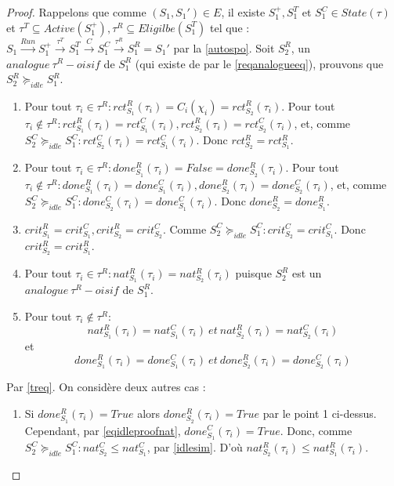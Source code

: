 \documentclass[a4paper]{report}
\theoremstyle{break}
\theoremstyle{breakplain}
\begin{document}
\begin{proof}
Rappelons que comme $(S_1, S_1') \in E$, il existe $S^{+}_1, S^{T}_1$ et $S^{C}_1 \in State(\tau)$ et $\tau^T \subseteq Active(S^{+}_1),\tau^R \subseteq Eligilbe(S^{T}_1) $ tel que : $S_1\xrightarrow{Run}S^{+}_1\xrightarrow{\tau^T}S^{T}_1\xrightarrow{C}S^{C}_1\xrightarrow{\tau^R}S_1^R=S_1'$ par la \autoref{autospo}. Soit $S_2^R$, un $analogue\ \tau^R-oisif$ de $S_1^R$ (qui existe de par le \autoref{reqanalogueeq}), prouvons que $S_2^R \succeq_{idle} S_1^R$.
\begin{enumerate}
\item Pour tout $\tau_i \in \tau^R : rct_{S_1}^R(\tau_i) = C_i(\chi_i) = rct_{S_2}^R(\tau_i)$. Pour tout $\tau_i \notin \tau^R : rct_{S_1}^R(\tau_i) = rct_{S_1}^C(\tau_i), rct_{S_2}^R(\tau_i) = rct_{S_2}^C(\tau_i)$, et, comme $S^C_2 \succeq_{idle} S^C_1 : rct_{S_2}^C(\tau_i) = rct_{S_1}^C(\tau_i)$. Donc $rct_{S_2}^R = rct_{S_1}^R$.
\item Pour tout $\tau_i \in \tau^R : done_{S_1}^R(\tau_i) = False = done_{S_2}^R(\tau_i)$. Pour tout $\tau_i \notin \tau^R : done_{S_1}^R(\tau_i) = done_{S_1}^C(\tau_i), done_{S_2}^R(\tau_i) = done_{S_2}^C(\tau_i)$, et, comme $S^C_2 \succeq_{idle} S^C_1 : done_{S_2}^C(\tau_i) = done_{S_1}^C(\tau_i)$. Donc $done_{S_2}^R = done_{S_1}^R$.
\item $crit^R_{S_1} = crit^C_{S_1}, crit^R_{S_2} = crit^C_{S_2}$. Comme $S^C_2 \succeq_{idle} S^C_1 : crit^C_{S_2} = crit^C_{S_1}$. Donc $crit^R_{S_2} = crit^R_{S_1}$.
\item Pour tout $\tau_i \in \tau^R : nat_{S_1}^R(\tau_i) = nat_{S_2}^R(\tau_i)$ puisque $S_2^R$ est un $analogue\ \tau^R-oisif$ de $S_1^R$.
\item Pour tout $\tau_i \notin \tau^R :$
\begin{equation}
\label{eqidleproofnat}
nat_{S_1}^R(\tau_i) = nat_{S_1}^C(\tau_i)\ et\ nat_{S_2}^R(\tau_i) = nat_{S_2}^C(\tau_i)
\end{equation}
et 
\begin{equation}
\label{eqidleproofdone}
done_{S_1}^R(\tau_i) = done_{S_1}^C(\tau_i)\ et\ done_{S_2}^R(\tau_i) = done_{S_2}^C(\tau_i)
\end{equation}
\end{enumerate}
Par \autoref{treq}. On considère deux autres cas :
\begin{enumerate}[label=(\alph*)]
\item Si $done_{S_1}^R(\tau_i) = True$ alors $done_{S_2}^R(\tau_i) = True$ par le point 1 ci-dessus. Cependant, par \eqref{eqidleproofnat}, $done_{S_1}^C(\tau_i) = True$. Donc, comme $S^C_2 \succeq_{idle} S^C_1 : nat_{S_2}^C \leq nat_{S_1}^C$, par \autoref{idlesim}. D'où $nat_{S_2}^R(\tau_i) \leq nat_{S_1}^R(\tau_i)$.

\end{enumerate}
\end{proof}
\end{document}
